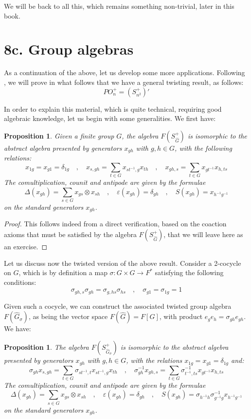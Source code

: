 \documentclass[12pt]{amsbook}
\newtheorem{proposition}[theorem]{Proposition}
\begin{document}
We will be back to all this, which remains something non-trivial, later in this book.

\section*{8c. Group algebras} 

As a continuation of the above, let us develop some more applications. Following \cite{bbs}, we will prove in what follows that we have a general twisting result, as follows: 
$$PO_n^+=(S_{n^2}^+)'$$

In order to explain this material, which is quite technical, requiring good algebraic knowledge, let us begin with some generalities. We first have:

\begin{proposition}
Given a finite group $G$, the algebra $F(S_{\widehat{G}}^+)$ is isomorphic to the abstract algebra presented by generators $x_{gh}$ with $g,h\in G$, with the following relations:
$$x_{1g}=x_{g1}=\delta_{1g}\quad,\quad
x_{s,gh}=\sum_{t\in G}x_{st^{-1},g}x_{th}\quad,\quad 
x_{gh,s}=\sum_{t\in G}x_{gt^{-1}}x_{h,ts}$$
The comultiplication, counit and antipode are given by the formulae
$$\Delta(x_{gh})=\sum_{s\in G}x_{gs}\otimes x_{sh}\quad,\quad 
\varepsilon(x_{gh})=\delta_{gh}\quad,\quad
S(x_{gh})=x_{h^{-1}g^{-1}}$$
on the standard generators $x_{gh}$.
\end{proposition}

\begin{proof}
This follows indeed from a direct verification, based on the coaction axioms that must be satisfied by the algebra $F(S_{\widehat{G}}^+)$, that we will leave here as an exercise.
\end{proof}

Let us discuss now the twisted version of the above result. Consider a 2-cocycle on $G$, which is by definition a map $\sigma:G\times G\to F^*$ satisfying the following conditions:
$$\sigma_{gh,s}\sigma_{gh}=\sigma_{g,hs}\sigma_{hs}\quad,\quad 
\sigma_{g1}=\sigma_{1g}=1$$

Given such a cocycle, we can construct the associated twisted group algebra $F(\widehat{G}_\sigma)$, as being the vector space $F(\widehat{G})=F[G]$, with product $e_ge_h=\sigma_{gh}e_{gh}$. We have:

\begin{proposition}
The algebra $F(S_{\widehat{G}_\sigma}^+)$ is isomorphic to the abstract algebra presented by generators $x_{gh}$ with $g,h\in G$, with the relations $x_{1g}=x_{g1}=\delta_{1g}$ and:
$$\sigma_{gh}x_{s,gh}=\sum_{t\in G}\sigma_{st^{-1},t}x_{st^{-1},g}x_{th}\quad,\quad
\sigma_{gh}^{-1}x_{gh,s}=\sum_{t\in G}\sigma_{t^{-1},ts}^{-1}x_{gt^{-1}}x_{h,ts}$$
The comultiplication, counit and antipode are given by the formulae
$$\Delta(x_{gh})=\sum_{s\in G}x_{gs}\otimes x_{sh}\quad,\quad 
\varepsilon(x_{gh})=\delta_{gh}\quad,\quad
S(x_{gh})=\sigma_{h^{-1}h}\sigma_{g^{-1}g}^{-1}x_{h^{-1}g^{-1}}$$
on the standard generators $x_{gh}$.
\end{proposition}
\end{document}
